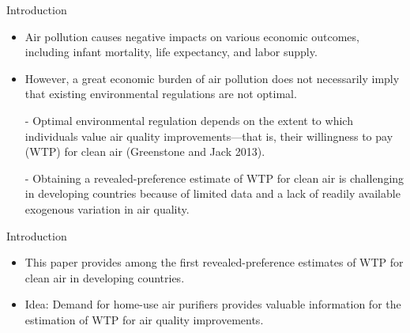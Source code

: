 \documentclass{beamer}
\begin{document}
\begin{frame}{Introduction}
	\begin{itemize}
		\item Air pollution causes negative impacts on various economic outcomes, including infant mortality, life expectancy, and labor supply.
		\item However, a great economic burden of air pollution does not necessarily imply that existing environmental regulations are not optimal.
		\item [-] Optimal environmental regulation depends on the extent to which individuals value air quality improvements—that is, their willingness to pay (WTP) for clean air (Greenstone and Jack 2013).
		\item [-] Obtaining a revealed-preference estimate of WTP for clean air
		is challenging in developing countries because of limited data and a lack of readily available exogenous variation in air quality.
	\end{itemize}
\end{frame}
\begin{frame}{Introduction}
	\begin{itemize}
		\item This paper provides among the first revealed-preference estimates of WTP for clean air in developing countries.
		\item Idea: Demand for home-use air purifiers provides valuable information	for the estimation of WTP for air quality improvements.
	\end{itemize}
\end{frame}

\end{document}
